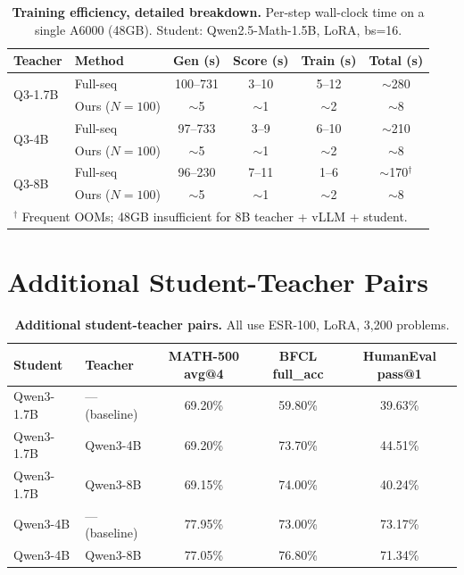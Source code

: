 \documentclass{article}
\begin{document}
\begin{table}[!htbp]
\centering
\caption{\textbf{Training efficiency, detailed breakdown.} Per-step wall-clock time on a single A6000 (48GB). Student: Qwen2.5-Math-1.5B, LoRA, bs=16.}
\label{tab:timing_detail}
\small
\begin{tabular}{llcccc}
\toprule
\textbf{Teacher} & \textbf{Method} & \textbf{Gen (s)} & \textbf{Score (s)} & \textbf{Train (s)} & \textbf{Total (s)} \\
\midrule
\multirow{2}{*}{Q3-1.7B} & Full-seq & 100--731 & 3--10 & 5--12 & ${\sim}$280 \\
 & Ours ($N{=}100$) & ${\sim}$5 & ${\sim}$1 & ${\sim}$2 & ${\sim}$8 \\
\midrule
\multirow{2}{*}{Q3-4B} & Full-seq & 97--733 & 3--9 & 6--10 & ${\sim}$210 \\
 & Ours ($N{=}100$) & ${\sim}$5 & ${\sim}$1 & ${\sim}$2 & ${\sim}$8 \\
\midrule
\multirow{2}{*}{Q3-8B} & Full-seq & 96--230 & 7--11 & 1--6 & ${\sim}$170$^\dagger$ \\
 & Ours ($N{=}100$) & ${\sim}$5 & ${\sim}$1 & ${\sim}$2 & ${\sim}$8 \\
\bottomrule
\multicolumn{6}{l}{\footnotesize $^\dagger$ Frequent OOMs; 48GB insufficient for 8B teacher + vLLM + student.}
\end{tabular}
\end{table}


\section{Additional Student-Teacher Pairs}
\label{app:additional_pairs}

\begin{table}[!htbp]
\centering
\caption{\textbf{Additional student-teacher pairs.} All use ESR-100, LoRA, 3,200 problems.}
\label{tab:additional_pairs}
\small
\begin{tabular}{llccc}
\toprule
\textbf{Student} & \textbf{Teacher} & \textbf{MATH-500 avg@4} & \textbf{BFCL full\_acc} & \textbf{HumanEval pass@1} \\
\midrule
Qwen3-1.7B & --- (baseline) & 69.20\% & 59.80\% & 39.63\% \\
Qwen3-1.7B & Qwen3-4B & 69.20\% & 73.70\% & 44.51\% \\
Qwen3-1.7B & Qwen3-8B & 69.15\% & 74.00\% & 40.24\% \\
\midrule
Qwen3-4B & --- (baseline) & 77.95\% & 73.00\% & 73.17\% \\
Qwen3-4B & Qwen3-8B & 77.05\% & 76.80\% & 71.34\% \\
\bottomrule
\end{tabular}
\end{table}
\end{document}
